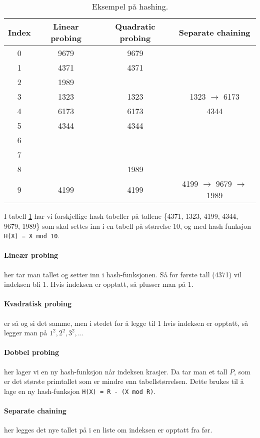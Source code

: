 \documentclass[11pt,a4paper]{article}
\begin{document}
\begin{table}[h!]
\centering
\begin{tabular}{c|c|c|c}
Index & Linear probing & Quadratic probing & Separate chaining\\
\hline
0 & 9679 & 9679 &\\
1 & 4371 & 4371 & \\
2 & 1989 & &\\
3 & 1323 & 1323 & 1323 $\rightarrow$ 6173\\
4 & 6173 & 6173 & 4344\\
5 & 4344 & 4344 &\\
6 & & &\\
7 & & &\\
8 & & 1989 &\\
9 & 4199 & 4199 & 4199 $\rightarrow$ 9679 $\rightarrow$ 1989\\
\end{tabular}
\label{tab:hash}
\caption{Eksempel på hashing.}
\end{table}
I tabell \ref{tab:hash} har vi forskjellige hash-tabeller på tallene \{4371, 1323, 4199, 4344, 9679, 1989\} som skal settes inn i en tabell på størrelse 10, og med hash-funksjon \texttt{H(X) = X mod 10}.

\paragraph{Lineær probing} her tar man tallet og setter inn i hash-funksjonen. Så for første tall (4371) vil indeksen bli 1. Hvis indeksen er opptatt, så plusser man på 1.

\paragraph{Kvadratisk probing} er så og si det samme, men i stedet for å legge til 1 hvis indeksen er opptatt, så legger man på $1^2, 2^2, 3^2,\dots$

\paragraph{Dobbel probing} her lager vi en ny hash-funksjon når indeksen krasjer. Da tar man et tall $P$, som er det største primtallet som er mindre enn tabellstørrelsen. Dette brukes til å lage en ny hash-funksjon \texttt{H(X) = R - (X mod R)}.

\paragraph{Separate chaining} her legges det nye tallet på i en liste om indeksen er opptatt fra før.
\end{document}
